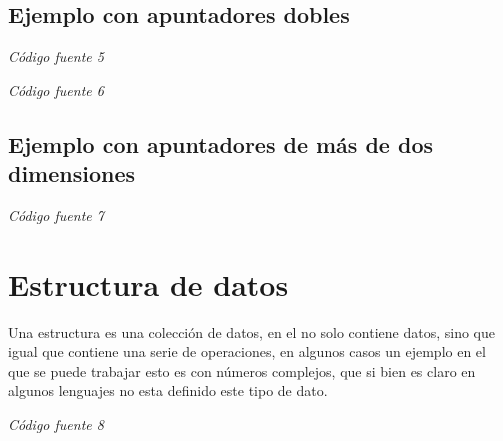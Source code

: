 \documentclass[10pt,executivepaper]{article}
\begin{document}
\subsection{Ejemplo con apuntadores dobles}

\begin{center}
\textit{Código fuente 5}\\
\end{center}

\begin{center}
\textit{Código fuente 6}\\
\end{center}
\subsection{Ejemplo con apuntadores de más de dos dimensiones}


\begin{center}
\textit{Código fuente 7}\\
\end{center}

\section{Estructura de datos}
Una estructura es una colección de datos, en el no solo contiene datos, sino que igual que contiene una serie de operaciones, en algunos casos un ejemplo en el que se puede trabajar esto es con números complejos, que si bien es claro en algunos lenguajes no esta definido este tipo de dato.

\begin{center}
\textit{Código fuente 8}\\
\end{center}
\end{document}
